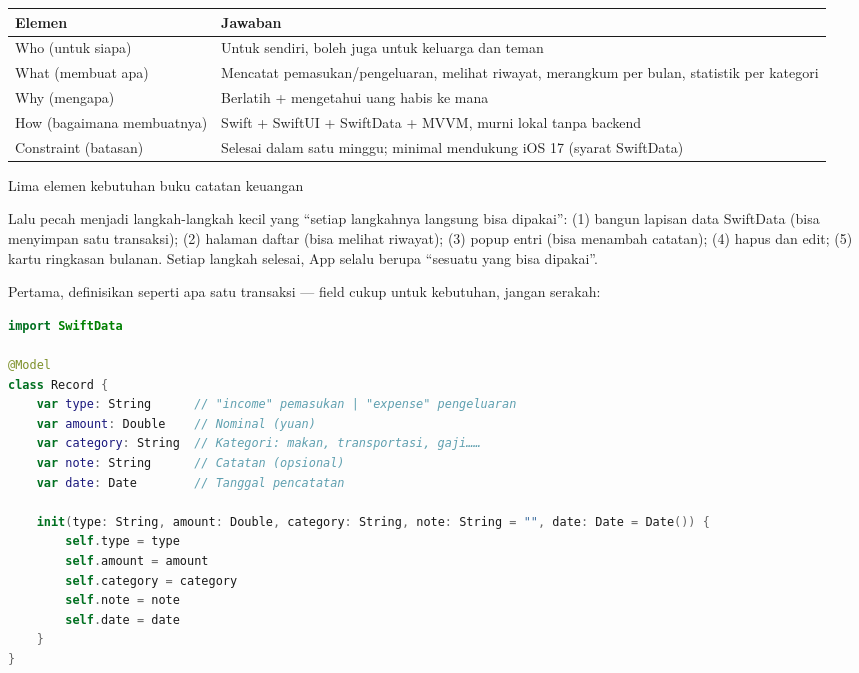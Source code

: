 


\begin{center}
\begin{tabularx}{\linewidth}{|X|X|}
\hline
\textbf{Elemen} & \textbf{Jawaban} \tabularnewline
\hline
Who (untuk siapa) & Untuk sendiri, boleh juga untuk keluarga dan teman \tabularnewline
What (membuat apa) & Mencatat pemasukan/pengeluaran, melihat riwayat, merangkum per bulan, statistik per kategori \tabularnewline
Why (mengapa) & Berlatih + mengetahui uang habis ke mana \tabularnewline
How (bagaimana membuatnya) & Swift + SwiftUI + SwiftData + MVVM, murni lokal tanpa backend \tabularnewline
Constraint (batasan) & Selesai dalam satu minggu; minimal mendukung iOS 17 (syarat SwiftData) \tabularnewline
\hline
\end{tabularx}
\end{center}

\begin{center}\small\color{gray}Lima elemen kebutuhan buku catatan keuangan\end{center}

Lalu pecah menjadi langkah-langkah kecil yang “setiap langkahnya langsung bisa dipakai”: (1) bangun lapisan data SwiftData (bisa menyimpan satu transaksi); (2) halaman daftar (bisa melihat riwayat); (3) popup entri (bisa menambah catatan); (4) hapus dan edit; (5) kartu ringkasan bulanan. Setiap langkah selesai, App selalu berupa “sesuatu yang bisa dipakai”.


Pertama, definisikan seperti apa satu transaksi — field cukup untuk kebutuhan, jangan serakah:

\begin{lstlisting}[language=Swift]
import SwiftData

@Model
class Record {
    var type: String      // "income" pemasukan | "expense" pengeluaran
    var amount: Double    // Nominal (yuan)
    var category: String  // Kategori: makan, transportasi, gaji……
    var note: String      // Catatan (opsional)
    var date: Date        // Tanggal pencatatan

    init(type: String, amount: Double, category: String, note: String = "", date: Date = Date()) {
        self.type = type
        self.amount = amount
        self.category = category
        self.note = note
        self.date = date
    }
}
\end{lstlisting}

